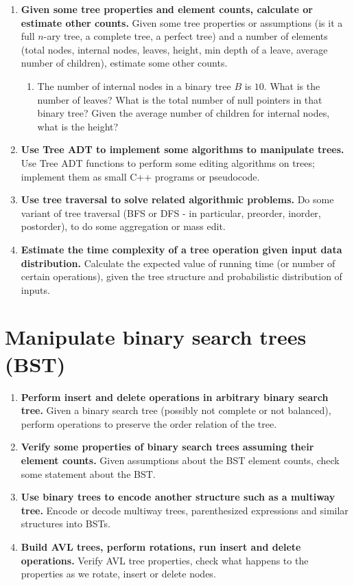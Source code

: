 \documentclass[a4paper,12pt]{article}
\begin{document}
\begin{enumerate}[label=2.\Alph*.]
\item {\bf Given some tree properties and element counts, calculate or estimate other counts.}
Given some tree properties or assumptions (is it a full $n$-ary tree, a complete tree, a perfect tree)
and a number of elements (total nodes, internal nodes, leaves, height, min depth of a leave, 
average number of children), estimate some other counts.
\begin{enumerate}
\item 
The number of internal nodes in a binary tree $B$ is $10$. What is the number of leaves?
What is the total number of null pointers in that binary tree?
  Given the average number of children for internal nodes, what is the height?
\end{enumerate}
\item {\bf Use Tree ADT to implement some algorithms to manipulate trees.}
Use Tree ADT functions to perform some editing algorithms on trees; 
implement them as small C++ programs or pseudocode.
\item {\bf Use tree traversal to solve related algorithmic problems.} 
Do some variant of tree traversal (BFS or DFS - in particular, preorder, inorder, postorder), 
to do some aggregation or mass edit.
\item {\bf Estimate the time complexity of a tree operation given input data distribution.}
Calculate the expected value of running time (or number of certain operations), 
given the tree structure and probabilistic distribution of inputs. 
\end{enumerate}

\section{Manipulate binary search trees (BST)}

\begin{enumerate}[label=3.\Alph*.]
\item {\bf Perform insert and delete operations in arbitrary binary search tree.}
Given a binary search tree (possibly not complete or not balanced), 
perform operations to preserve the order relation of the tree.
\item {\bf Verify some properties of binary search trees assuming their element counts.}
Given assumptions about the BST element counts, check some statement about the BST.
\item {\bf Use binary trees to encode another structure such as a multiway tree.}
Encode or decode multiway trees, parenthesized expressions and similar structures into BSTs.
\item {\bf Build AVL trees, perform rotations, run insert and delete operations.}
Verify AVL tree properties, check what happens to the properties as we rotate, insert or delete nodes.
\end{enumerate}
\end{document}
